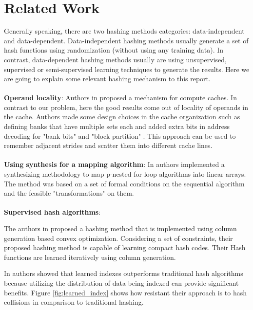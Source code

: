\section{Related Work}
\label{related_work}
Generally speaking, there are two hashing methods categories: data-independent and data-dependent. Data-independent hashing methods usually generate a set of hash functions using randomization (without using any training data). In contrast,  data-dependent hashing methods usually are using unsupervised, supervised or semi-supervised learning techniques to generate the results. Here we are going to explain some relevant hashing mechanism to this report. 
\\
~
\\
\textbf{Operand locality}: Authors in \cite{compute-caches} proposed a mechanism for compute caches. In contrast to our problem, here the good results come out of locality of operands in the cache. Authors made some design choices in the cache organization such as defining banks that
have multiple sets each and added extra bits in address decoding for "bank bits" and "block partition" \cite{compute-caches}. This approach can be used to remember adjacent strides and scatter them into different cache lines.
\\
~
\\
\textbf{Using synthesis for a mapping algorithm}: In \cite{synthesis-map} authors implemented a synthesizing methodology to map p-nested for loop algorithms into linear arrays. The method was based on a set of formal conditions on the sequential algorithm and the feasible "transformations" on them. 
\\
~
\\
\textbf{Supervised hash algorithms}:

The authors in \cite{learning-hash} proposed a hashing method that is implemented using column generation based convex optimization. Considering a set of constraints, their proposed hashing method is capable of learning compact hash codes. Their Hash functions are learned iteratively using column generation.

In \cite{learning-index} authors showed that learned indexes outperforms traditional hash algorithms because utilizing the distribution of data being indexed can provide significant benefits. Figure \ref{fig:learned_index} shows how resistant their approach is to hash collisions in comparison to traditional hashing. 

